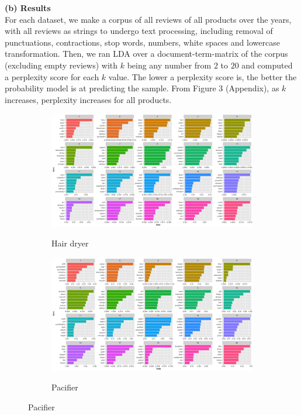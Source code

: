 \documentclass[reqno]{article}
\theoremstyle{definition}
\theoremstyle{definition}
\theoremstyle{remark}
\begin{document}
\textbf{(b) Results} \\
For each dataset, we make a corpus of all reviews of all products over the years, with all reviews as strings to undergo text processing, including removal of punctuations, contractions, stop words, numbers, white spaces and lowercase transformation. Then, we ran LDA over a document-term-matrix of the corpus (excluding empty reviews) with $k$ being any number from $2$ to $20$ and computed a perplexity score for each $k$ value. The lower a perplexity score is, the better the probability model is at predicting the sample. From Figure 3 (Appendix), as $k$ increases, perplexity increases for all products. \\
\newpage
\begin{figure}[htbp]
\caption{Beta distribution of words over topics, k = 20}
\begin{subfigure}{\textwidth}
\begin{center}
    \includegraphics[width= \linewidth]{hair_dryer_top_terms.png}
    \label{fig:sfig1}
    \caption{Hair dryer}
\end{center}
\end{subfigure}
\begin{subfigure}{\textwidth}
\begin{center}
    \includegraphics[width= \linewidth]{pacifier_top_terms.png}
    \label{fig:sfig2}
    \caption{Pacifier}
\end{center}
\end{subfigure}
\end{figure}
\end{document}
